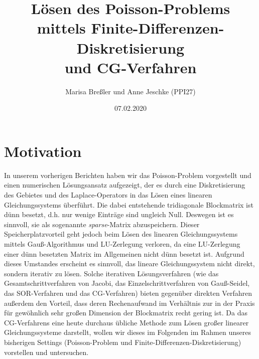 \documentclass{scrartcl}
\begin{document}
\title{Lösen des Poisson-Problems mittels Finite-Differenzen-Diskretisierung\\
und CG-Verfahren}
\author{Marisa Breßler und Anne Jeschke (PPI27)}
\date{07.02.2020}
\maketitle

\tableofcontents

\pagebreak
\section{Motivation}
In unserem vorherigen Berichten haben wir das Poisson-Problem vorgestellt und einen numerischen Lösungsansatz aufgezeigt, der es durch eine Diskretisierung des Gebietes und des Laplace-Operators in das Lösen eines linearen Gleichungssystems überführt. 
Die dabei entstehende tridiagonale Blockmatrix ist dünn besetzt, d.h. nur wenige Einträge sind ungleich Null. 
Deswegen ist es sinnvoll, sie als sogenannte \textit{sparse}-Matrix abzuspeichern. 
Dieser Speicherplatzvorteil geht jedoch beim Lösen des linearen Gleichungssystems mittels Gauß-Algorithmus und LU-Zerlegung verloren, da eine LU-Zerlegung einer dünn besetzten Matrix im Allgemeinen nicht dünn besetzt ist. 
Aufgrund dieses Umstandes erscheint es sinnvoll, das lineare Gleichungssystem nicht direkt, sondern iterativ zu lösen.
Solche iterativen Lösungsverfahren (wie das Gesamtschrittverfahren von Jacobi, das Einzelschrittverfahren von Gauß-Seidel, das SOR-Verfahren und das CG-Verfahren) bieten gegenüber direkten Verfahren außerdem den Vorteil, dass deren Rechenaufwand im Verhältnis zur in der Praxis für gewöhnlich sehr großen Dimension der Blockmatrix recht gering ist.
Da das CG-Verfahrens eine heute durchaus übliche Methode zum Lösen großer linearer Gleichungssysteme darstellt, wollen wir dieses im Folgenden im Rahmen unseres bisherigen Settings (Poisson-Problem und Finite-Differenzen-Diskretisierung) vorstellen und untersuchen. 



\pagebreak
\end{document}
